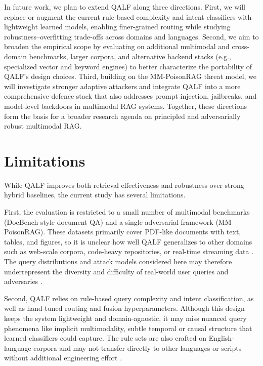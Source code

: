 \documentclass[11pt]{article}
\begin{document}
In future work, we plan to extend QALF along three directions. First, we will replace or augment the current rule-based complexity and intent classifiers with lightweight learned models, enabling finer-grained routing while studying robustness–overfitting trade-offs across domains and languages. Second, we aim to broaden the empirical scope by evaluating on additional multimodal and cross-domain benchmarks, larger corpora, and alternative backend stacks (e.g., specialized vector and keyword engines) to better characterize the portability of QALF’s design choices. Third, building on the MM-PoisonRAG threat model, we will investigate stronger adaptive attackers and integrate QALF into a more comprehensive defence stack that also addresses prompt injection, jailbreaks, and model-level backdoors in multimodal RAG systems. Together, these directions form the basis for a broader research agenda on principled and adversarially robust multimodal RAG.

\section*{Limitations}

While QALF improves both retrieval effectiveness and robustness over strong hybrid baselines, the current study has several limitations.

First, the evaluation is restricted to a small number of multimodal benchmarks (DocBench-style document QA) and a single adversarial framework (MM-PoisonRAG). These datasets primarily cover PDF-like documents with text, tables, and figures, so it is unclear how well QALF generalizes to other domains such as web-scale corpora, code-heavy repositories, or real-time streaming data \cite{mei_survey_2025,xia_mmed-rag_2025}. The query distributions and attack models considered here may therefore underrepresent the diversity and difficulty of real-world user queries and adversaries \cite{ha_mm-poisonrag_2025,amirshahi_evaluating_2025}.

Second, QALF relies on rule-based query complexity and intent classification, as well as hand-tuned routing and fusion hyperparameters. Although this design keeps the system lightweight and domain-agnostic, it may miss nuanced query phenomena like implicit multimodality, subtle temporal or causal structure that learned classifiers could capture. The rule sets are also crafted on English-language corpora and may not transfer directly to other languages or scripts without additional engineering effort \cite{jeong_adaptive-rag_2024,huang_layered_2024}.
\end{document}
